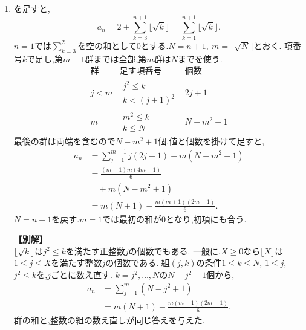 \noindent {}\par\nobreak
\begin{enumerate}[label=(\arabic*),parsep=3pt,beginpenalty=10000,format=\bookitemlink{example-gauss-role-2}{solution}{problem}]
  \item {}を足すと,
    \[
      a_n=2+\sum_{k=3}^{n+1}\lfloor\sqrt k\rfloor
      =\sum_{k=1}^{n+1}\lfloor\sqrt k\rfloor.
    \]
    $n=1$では$\sum_{k=3}^{2}$を空の和として0とする.$N=n+1,\ m=\lfloor\sqrt N\rfloor$とおく.
    項番号$k$で足し,第$m-1$群までは全部,第$m$群は$N$までを使う.
    \[
      \begin{array}{c|c|c}
        \text{群}&\text{足す項番号}&\text{個数}\\ \hline
        j<m&\substack{j^2\le k\\ k<(j+1)^2}&2j+1\\
        m&\substack{m^2\le k\\ k\le N}&N-m^2+1
      \end{array}
    \]
    最後の群は両端を含むので$N-m^2+1$個.値と個数を掛けて足すと,
    \begin{align*}
      a_n&=\sum_{j=1}^{m-1}j(2j+1)+m(N-m^2+1)\\
      &=\frac{(m-1)m(4m+1)}6\\
      &\quad+m(N-m^2+1)\\
      &=m(N+1)-\frac{m(m+1)(2m+1)}6.
    \end{align*}
    $N=n+1$を戻す.$m=1$では最初の和が0となり,初項にも合う.

    \noindent \textbf{【別解】}\\
    $\lfloor\sqrt k\rfloor$は$j^2\le k$を満たす正整数$j$の個数でもある.
    一般に,$X\ge0$なら$\lfloor X\rfloor$は$1\le j\le X$を満たす整数$j$の個数である.
    組$(j,k)$の条件$1\le k\le N$, $1\le j$, $j^2\le k$を,$j$ごとに数え直す.
    $k=j^2,\ldots,N$の$N-j^2+1$個から,
    \begin{align*}
      a_n&=\sum_{j=1}^{m}(N-j^2+1)\\
      &=m(N+1)-\frac{m(m+1)(2m+1)}6.
    \end{align*}
    群の和と,整数の組の数え直しが同じ答えを与えた.
\end{enumerate}
